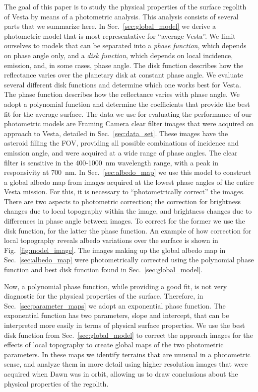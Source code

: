 \documentclass[3p,authoryear]{elsarticle}
\begin{document}
The goal of this paper is to study the physical properties of the surface regolith of Vesta by means of a photometric analysis. This analysis consists of several parts that we summarize here. In Sec.~\ref{sec:global_model} we derive a photometric model that is most representative for ``average Vesta''. We limit ourselves to models that can be separated into a {\it phase function}, which depends on phase angle only, and a {\it disk function}, which depends on local incidence, emission, and, in some cases, phase angle. The disk function describes how the reflectance varies over the planetary disk at constant phase angle. We evaluate several different disk functions and determine which one works best for Vesta. The phase function describes how the reflectance varies with phase angle. We adopt a polynomial function and determine the coefficients that provide the best fit for the average surface. The data we use for evaluating the performance of our photometric models are Framing Camera clear filter images that were acquired on approach to Vesta, detailed in Sec.~\ref{sec:data_set}. These images have the asteroid filling the FOV, providing all possible combinations of incidence and emission angle, and were acquired at a wide range of phase angles. The clear filter is sensitive in the 400-1000~nm wavelength range, with a peak in responsivity at 700~nm. In Sec.~\ref{sec:albedo_map} we use this model to construct a global albedo map from images acquired at the lowest phase angles of the entire Vesta mission. For this, it is necessary to ``photometrically correct'' the images. There are two aspects to photometric correction; the correction for brightness changes due to local topography within the image, and brightness changes due to differences in phase angle between images. To correct for the former we use the disk function, for the latter the phase function. An example of how correction for local topography reveals albedo variations over the surface is shown in Fig.~\ref{fig:model_image}. The images making up the global albedo map in Sec.~\ref{sec:albedo_map} were photometrically corrected using the polynomial phase function and best disk function found in Sec.~\ref{sec:global_model}.

Now, a polynomial phase function, while providing a good fit, is not very diagnostic for the physical properties of the surface. Therefore, in Sec.~\ref{sec:parameter_maps} we adopt an exponential phase function. The exponential function has two parameters, slope and intercept, that can be interpreted more easily in terms of physical surface properties. We use the best disk function from Sec.~\ref{sec:global_model} to correct the approach images for the effects of local topography to create global maps of the two photometric parameters. In these maps we identify terrains that are unusual in a photometric sense, and analyze them in more detail using higher resolution images that were acquired when Dawn was in orbit, allowing us to draw conclusions about the physical properties of the regolith.
\end{document}
